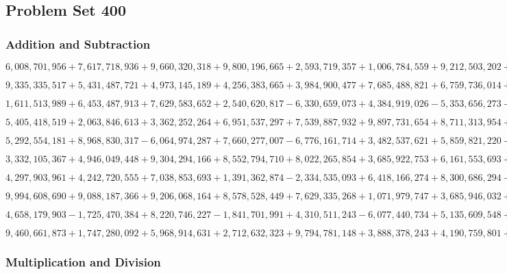 \hypertarget{problem-set-400}{%
\subsection{Problem Set 400}\label{problem-set-400}}

\hypertarget{addition-and-subtraction}{%
\subsubsection{Addition and
Subtraction}\label{addition-and-subtraction}}

\(6,008,701,956+7,617,718,936+9,660,320,318+9,800,196,665+2,593,719,357+1,006,784,559+9,212,503,202+5,428,010,240+2,561,346,505+5,110,276,155\)

\(9,335,335,517+5,431,487,721+4,973,145,189+4,256,383,665+3,984,900,477+7,685,488,821+6,759,736,014+2,352,365,130+1,184,386,432+7,442,841,194\)

\(1,611,513,989+6,453,487,913+7,629,583,652+2,540,620,817-6,330,659,073+4,384,919,026-5,353,656,273-3,165,151,081+3,910,161,341-9,675,665,728\)

\(5,405,418,519+2,063,846,613+3,362,252,264+6,951,537,297+7,539,887,932+9,897,731,654+8,711,313,954+9,856,334,054+1,264,450,463+6,094,027,536\)

\(5,292,554,181+8,968,830,317-6,064,974,287+7,660,277,007-6,776,161,714+3,482,537,621+5,859,821,220-8,596,032,289-7,617,287,104+6,166,824,703\)

\(3,332,105,367+4,946,049,448+9,304,294,166+8,552,794,710+8,022,265,854+3,685,922,753+6,161,553,693+7,066,364,751+8,327,625,418+9,031,712,797\)

\(4,297,903,961+4,242,720,555+7,038,853,693+1,391,362,874-2,334,535,093+6,418,166,274+8,300,686,294-8,521,303,225-3,103,084,140-6,734,993,091\)

\(9,994,608,690+9,088,187,366+9,206,068,164+8,578,528,449+7,629,335,268+1,071,979,747+3,685,946,032+1,512,807,581+5,262,083,036+3,923,825,661\)

\(4,658,179,903-1,725,470,384+8,220,746,227-1,841,701,991+4,310,511,243-6,077,440,734+5,135,609,548+7,724,120,758+6,814,423,636-7,783,465,398\)

\(9,460,661,873+1,747,280,092+5,968,914,631+2,712,632,323+9,794,781,148+3,888,378,243+4,190,759,801+5,762,451,774+8,551,956,322+8,321,796,726\)

\hypertarget{multiplication-and-division}{%
\subsubsection{Multiplication and
Division}\label{multiplication-and-division}}

